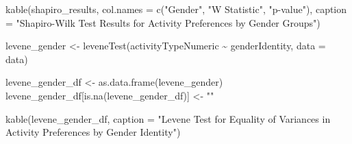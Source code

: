 \documentclass[
  letterpaper,
  DIV=11,
  numbers=noendperiod]{scrartcl}
\newenvironment{Shaded}{\begin{snugshade}}{\end{snugshade}}
\newcommand{\AttributeTok}[1]{\textcolor[rgb]{0.40,0.45,0.13}{#1}}
\newcommand{\ConstantTok}[1]{\textcolor[rgb]{0.56,0.35,0.01}{#1}}
\newcommand{\DecValTok}[1]{\textcolor[rgb]{0.68,0.00,0.00}{#1}}
\newcommand{\FunctionTok}[1]{\textcolor[rgb]{0.28,0.35,0.67}{#1}}
\newcommand{\NormalTok}[1]{\textcolor[rgb]{0.00,0.23,0.31}{#1}}
\newcommand{\OtherTok}[1]{\textcolor[rgb]{0.00,0.23,0.31}{#1}}
\newcommand{\SpecialCharTok}[1]{\textcolor[rgb]{0.37,0.37,0.37}{#1}}
\newcommand{\StringTok}[1]{\textcolor[rgb]{0.13,0.47,0.30}{#1}}
\begin{document}
\begin{Shaded}
\begin{Highlighting}[]
\FunctionTok{kable}\NormalTok{(shapiro\_results, }\AttributeTok{col.names =} \FunctionTok{c}\NormalTok{(}\StringTok{"Gender"}\NormalTok{, }\StringTok{"W Statistic"}\NormalTok{, }\StringTok{"p{-}value"}\NormalTok{),}
      \AttributeTok{caption =} \StringTok{"Shapiro{-}Wilk Test Results for Activity Preferences }
\StringTok{      by Gender Groups"}\NormalTok{)}
\end{Highlighting}
\end{Shaded}

\begin{Shaded}
\begin{Highlighting}[]
\NormalTok{levene\_gender }\OtherTok{\textless{}{-}} \FunctionTok{leveneTest}\NormalTok{(activityTypeNumeric }\SpecialCharTok{\textasciitilde{}}\NormalTok{ genderIdentity, }\AttributeTok{data =}\NormalTok{ data)}

\NormalTok{levene\_gender\_df }\OtherTok{\textless{}{-}} \FunctionTok{as.data.frame}\NormalTok{(levene\_gender)}
\NormalTok{levene\_gender\_df[}\FunctionTok{is.na}\NormalTok{(levene\_gender\_df)] }\OtherTok{\textless{}{-}} \StringTok{""}

\FunctionTok{kable}\NormalTok{(levene\_gender\_df, }\AttributeTok{caption =} \StringTok{"Levene Test for Equality of Variances in }
\StringTok{      Activity Preferences by Gender Identity"}\NormalTok{)}
\end{Highlighting}
\end{Shaded}

\begin{Shaded}
\end{Shaded}
\end{document}

